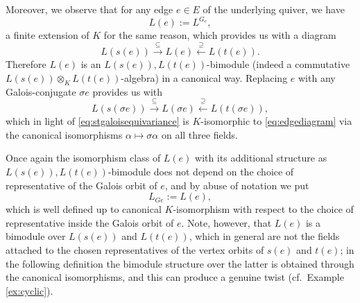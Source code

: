 \documentclass[a4paper,12pt,reqno]{amsart}
\theoremstyle{plain}
\theoremstyle{remark}
\begin{document}
  Moreover, we observe that for any edge $e\in E$ of the underlying quiver, we have
  \[
  L(e):=L^{G_{e}},
  \]
  a finite extension of $K$ for the same reason, which provides us with a diagram
  \begin{equation}
    L(s(e))\xrightarrow\subseteq L(e)\xleftarrow\supseteq L(t(e)).
    \label{eq:edgediagram}
  \end{equation}
  Therefore $L(e)$ is an $L(s(e)),L(t(e))$-bimodule (indeed a commutative $L(s(e))\otimes_KL(t(e))$-algebra) in a canonical way. Replacing $e$ with any Galois-conjugate $\sigma e$ provides us with
  \[
  L(s(\sigma e))\xrightarrow\subseteq L(\sigma e)\xleftarrow\supseteq L(t(\sigma e)),
  \]
  which in light of \eqref{eq:stgaloisequivariance} is $K$-isomorphic to \eqref{eq:edgediagram} via the canonical isomorphisms $\alpha\mapsto\sigma\alpha$ on all three fields.

  Once again the isomorphism class of $L(e)$ with its additional structure as $L(s(e)),L(t(e))$-bimodule does not depend on the choice of representative of the Galois orbit of $e$, and by abuse of notation we put
  \begin{equation}
    L_{Ge}:=L(e),
    \label{eq:abusivedefinitionofLe}
  \end{equation}
  which is well defined up to canonical $K$-isomorphism with respect to the choice of representative inside the Galois orbit of $e$. Note, however, that $L(e)$ is a bimodule over $L(s(e))$ and $L(t(e))$, which in general are not the fields attached to the chosen representatives of the vertex orbits of $s(e)$ and $t(e)$; in the following definition the bimodule structure over the latter is obtained through the canonical isomorphisms, and this can produce a genuine twist (cf.\ Example \ref{ex:cyclic}).
\end{document}
